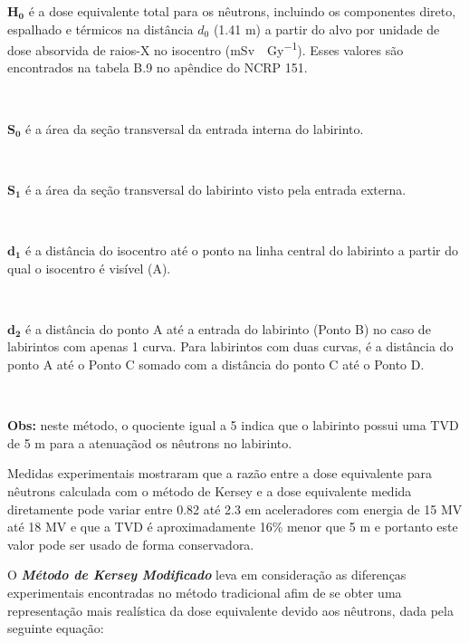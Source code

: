\documentclass[11pt,a4paper]{article}
\newcounter{exemplo}
\begin{document}
        \begin{exemplo}[onde:]
            \textcolor{CarnationPink}{$\mathbf{H_0}$} é a dose equivalente total para os nêutrons, incluindo os componentes direto, espalhado e térmicos na distância $d_0$ (1.41 m) a partir do alvo por unidade de dose absorvida de raios-X no isocentro (\unit{mSv \cdot Gy^{-1}}). Esses valores são encontrados na tabela B.9 no apêndice do NCRP 151.

            \

            \textcolor{CarnationPink}{$\mathbf{S_0}$} é a área da seção transversal da entrada interna do labirinto.

            \

            \textcolor{CarnationPink}{$\mathbf{S_1}$} é a área da seção transversal do labirinto visto pela entrada externa.

            \

            \textcolor{CarnationPink}{$\mathbf{d_1}$} é a distância do isocentro até o ponto na linha central do labirinto a partir do qual o isocentro é visível (A).

            \

            \textcolor{CarnationPink}{$\mathbf{d_2}$} é a distância do ponto A até a entrada do labirinto (Ponto B) no caso de labirintos com apenas 1 curva. Para labirintos com duas curvas, é a distância do ponto A até o Ponto C somado com a distância do ponto C até o Ponto D.

            \

            \textcolor{CarnationPink}{\textbf{Obs:}} neste método, o quociente igual a 5 indica que o labirinto possui uma TVD de 5 m para a atenuaçãod os nêutrons no labirinto. 

        \end{exemplo}

        Medidas experimentais mostraram que a razão entre a dose equivalente para nêutrons calculada com o método de Kersey e a dose equivalente medida diretamente pode variar entre 0.82 até 2.3 em aceleradores com energia de 15 MV até 18 MV e que a TVD é aproximadamente 16\% menor que 5 m e portanto este valor pode ser usado de forma conservadora.

        O \textcolor{CarnationPink}{\textbf{\textit{Método de Kersey Modificado}}} leva em consideração as diferenças experimentais encontradas no método tradicional afim de se obter uma representação mais realística da dose equivalente devido aos nêutrons, dada pela seguinte equação:
\end{document}
